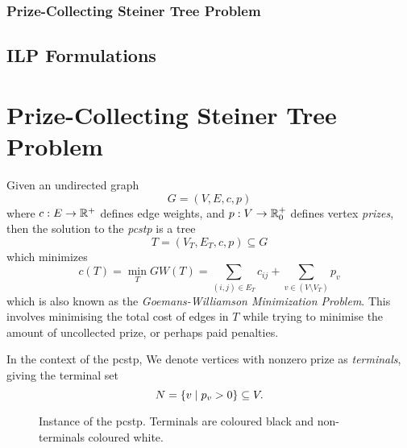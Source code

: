 \subsubsection{Prize-Collecting Steiner Tree Problem}

\subsection{ILP Formulations}
\section{Prize-Collecting Steiner Tree Problem}
\label{sec:pcstp}
Given an undirected graph
$$G = (V, E, c, p)$$
where $c: E \to \mathbb{R}^+$ defines edge weights,
and $p: V \to \mathbb{R}_0^+$ defines vertex \textit{prizes}, then the solution to the
\textit{\gls{pcstp}} is a tree
$$T = (V_T, E_T, c, p) \subseteq G$$
which minimizes
$$c(T) = \min_T GW(T) = \sum_{(i,j) \in E_T} c_{ij} + \sum_{v\in (V \setminus V_T)} p_v$$
which is also known as the {\textit{Goemans-Williamson Minimization Problem}}. This involves minimising
 the total cost of edges in $T$ while trying to minimise the amount of uncollected prize, or perhaps paid penalties.

In the context of the \gls{pcstp}, We denote vertices with nonzero prize as \textit{terminals}, giving the terminal set
$$N = \{v \mid p_v > 0\} \subseteq V\mathnormal{.}$$

\begin{figure}[h]\centering
{}
\caption{Instance of the \gls{pcstp}. Terminals are coloured black and non-terminals coloured white.}
\label{fig:pcstp:01}
\end{figure}

